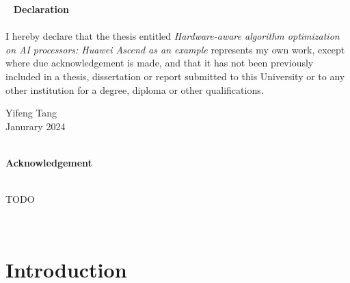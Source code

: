 \documentclass[12pt]{extbook}
\begin{document}
\justifying

\newpage
\thispagestyle{empty}
~
\newpage
\thispagestyle{empty}
\centering
{\bf \large Declaration}\\
~\\
\justifying
I hereby declare that the thesis entitled \textit{Hardware-aware algorithm optimization on AI processors: Huawei Ascend as an example} represents my own work, except where due acknowledgement is made, and that it has not been previously included in a thesis, dissertation or report submitted to this University or to any other institution for a degree, diploma or other qualifications.

\flushright

Yifeng Tang\\
Janurary 2024\\

\justifying
\newpage
\thispagestyle{empty}
~

\newpage
\thispagestyle{empty}
\centering
{\bf \large Acknowledgement}\\
~\\
\justifying

TODO

\thispagestyle{empty}
\newpage
\setcounter{page}{1}

\tableofcontents

\newpage

\listoffigures

\newpage

\listoftables

\newpage
\thispagestyle{empty}
~

\newpage
\setcounter{page}{1}

\chapter{Introduction}
\label{chp_1_introduction}
\end{document}
